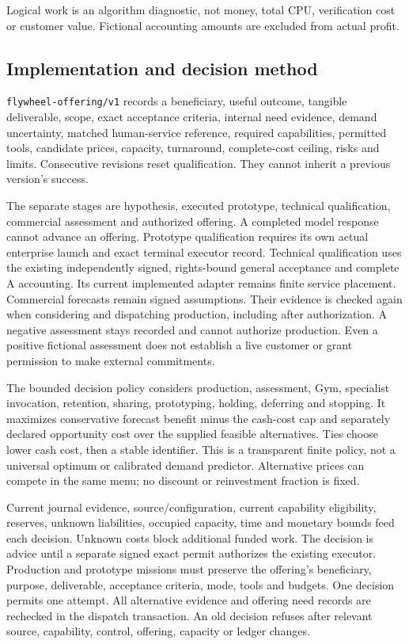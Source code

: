 \documentclass[
  10pt,
]{article}
\begin{document}
Logical work is an algorithm diagnostic, not money, total CPU,
verification cost or customer value. Fictional accounting amounts are
excluded from actual profit.

\hypertarget{implementation-and-decision-method}{%
\subsection{Implementation and decision
method}\label{implementation-and-decision-method}}

\texttt{flywheel-offering/v1} records a beneficiary, useful outcome,
tangible deliverable, scope, exact acceptance criteria, internal need
evidence, demand uncertainty, matched human-service reference, required
capabilities, permitted tools, candidate prices, capacity, turnaround,
complete-cost ceiling, risks and limits. Consecutive revisions reset
qualification. They cannot inherit a previous version's success.

The separate stages are hypothesis, executed prototype, technical
qualification, commercial assessment and authorized offering. A
completed model response cannot advance an offering. Prototype
qualification requires its own actual enterprise launch and exact
terminal executor record. Technical qualification uses the existing
independently signed, rights-bound general acceptance and complete A
accounting. Its current implemented adapter remains finite service
placement. Commercial forecasts remain signed assumptions. Their
evidence is checked again when considering and dispatching production,
including after authorization. A negative assessment stays recorded and
cannot authorize production. Even a positive fictional assessment does
not establish a live customer or grant permission to make external
commitments.

The bounded decision policy considers production, assessment, Gym,
specialist invocation, retention, sharing, prototyping, holding,
deferring and stopping. It maximizes conservative forecast benefit minus
the cash-cost cap and separately declared opportunity cost over the
supplied feasible alternatives. Ties choose lower cash cost, then a
stable identifier. This is a transparent finite policy, not a universal
optimum or calibrated demand predictor. Alternative prices can compete
in the same menu; no discount or reinvestment fraction is fixed.

Current journal evidence, source/configuration, current capability
eligibility, reserves, unknown liabilities, occupied capacity, time and
monetary bounds feed each decision. Unknown costs block additional
funded work. The decision is advice until a separate signed exact permit
authorizes the existing executor. Production and prototype missions must
preserve the offering's beneficiary, purpose, deliverable, acceptance
criteria, mode, tools and budgets. One decision permits one attempt. All
alternative evidence and offering need records are rechecked in the
dispatch transaction. An old decision refuses after relevant source,
capability, control, offering, capacity or ledger changes.
\end{document}
